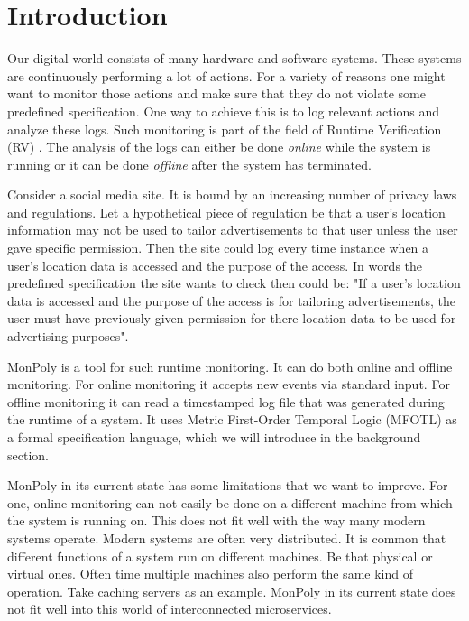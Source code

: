 \section{Introduction}

Our digital world consists of many hardware and software systems.
These systems are continuously performing a lot of actions.
For a variety of reasons one might want to monitor those actions and make sure that they do not violate some predefined specification.
One way to achieve this is to log relevant actions and analyze these logs.
Such monitoring is part of the field of Runtime Verification (RV) \cite{Bartocci2018}.
The analysis of the logs can either be done \textit{online} while the system is running or it can be done \textit{offline} after the system has terminated.

Consider a social media site.
It is bound by an increasing number of privacy laws and regulations.
Let a hypothetical piece of regulation be that a user's location information may not be used to tailor advertisements to that user unless the user gave specific permission.
Then the site could log every time instance when a user's location data is accessed and the purpose of the access.
In words the predefined specification the site wants to check then could be:
    "If a user's location data is accessed and the purpose of the access is for tailoring advertisements, the user must have previously given permission for there location data to be used for advertising purposes".

MonPoly \cite{Basin2017} is a tool for such runtime monitoring.
It can do both online and offline monitoring.
For online monitoring it accepts new events via standard input.
For offline monitoring it can read a timestamped log file that was generated during the runtime of a system.
It uses Metric First-Order Temporal Logic (MFOTL) \cite{Basin2008, Basin2015, Chomicki1995} as a formal specification language, which we will introduce in the background section.

MonPoly in its current state has some limitations that we want to improve.
For one, online monitoring can not easily be done on a different machine from which the system is running on.
This does not fit well with the way many modern systems operate.
Modern systems are often very distributed.
It is common that different functions of a system run on different machines.
Be that physical or virtual ones.
Often time multiple machines also perform the same kind of operation.
Take caching servers as an example.
MonPoly in its current state does not fit well into this world of interconnected microservices.

